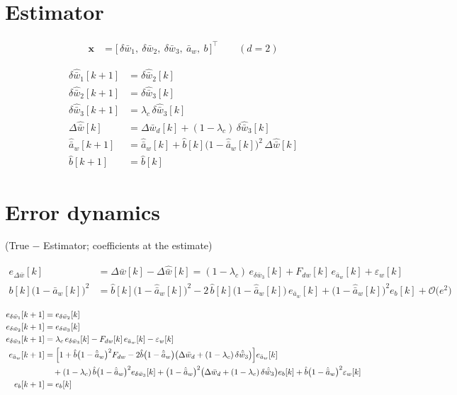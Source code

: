 \documentclass[11pt,a4paper,fontset=none]{ctexart}
\newcommand{\ba}{\bar{a}}
\newcommand{\bw}{\bar{w}}
\newcommand{\dW}{\Delta\bw}
\newcommand{\dWh}{\Delta\hat{\bw}}
\newcommand{\eD}{e_{\Delta\bw}}
\newcommand{\ah}{\hat{\ba}_w}
\newcommand{\bh}{\hat{b}}
\begin{document}
\section{Estimator}

\begin{align*}
\mathbf{x} &= \bigl[\,\delta\bw_1,\ \delta\bw_2,\ \delta\bw_3,\ \ba_w,\ b\,\bigr]^{\top} \qquad (d = 2)
\end{align*}

\begin{align*}
\delta\hat{\bw}_1[k+1] &= \delta\hat{\bw}_2[k] \\
\delta\hat{\bw}_2[k+1] &= \delta\hat{\bw}_3[k] \\
\delta\hat{\bw}_3[k+1] &= \lambda_c\,\delta\hat{\bw}_3[k] \\
\dWh[k]                &= \Delta\bw_d[k] + (1-\lambda_c)\,\delta\hat{\bw}_3[k] \\
\ah[k+1]               &= \ah[k] + \bh[k]\bigl(1-\ah[k]\bigr)^{2}\,\dWh[k] \\
\bh[k+1]               &= \bh[k]
\end{align*}

\section{Error dynamics}

(True $-$ Estimator; coefficients at the estimate)

\begin{align*}
\eD[k] &= \dW[k] - \dWh[k] = (1-\lambda_c)\,e_{\delta\bw_3}[k] + F_{dw}[k]\,e_{\ba_w}[k] + \varepsilon_w[k] \\
b[k]\bigl(1-\ba_w[k]\bigr)^{2} &= \bh[k]\bigl(1-\ah[k]\bigr)^{2} - 2\,\bh[k]\bigl(1-\ah[k]\bigr)\,e_{\ba_w}[k] + \bigl(1-\ah[k]\bigr)^{2}e_b[k] + \mathcal{O}\bigl(e^{2}\bigr)
\end{align*}

\begin{align*}
e_{\delta\bw_1}[k+1] &= e_{\delta\bw_2}[k] \\
e_{\delta\bw_2}[k+1] &= e_{\delta\bw_3}[k] \\
e_{\delta\bw_3}[k+1] &= \lambda_c\,e_{\delta\bw_3}[k] - F_{dw}[k]\,e_{\ba_w}[k] - \varepsilon_w[k] \\
e_{\ba_w}[k+1] &= \Bigl[1 + \bh\bigl(1-\ah\bigr)^{2}F_{dw} - 2\bh\bigl(1-\ah\bigr)\bigl(\Delta\bw_d + (1-\lambda_c)\,\delta\hat{\bw}_3\bigr)\Bigr]e_{\ba_w}[k] \\
  &\quad + (1-\lambda_c)\,\bh\bigl(1-\ah\bigr)^{2}e_{\delta\bw_3}[k]
        + \bigl(1-\ah\bigr)^{2}\bigl(\Delta\bw_d + (1-\lambda_c)\,\delta\hat{\bw}_3\bigr)e_b[k]
        + \bh\bigl(1-\ah\bigr)^{2}\varepsilon_w[k] \\
e_b[k+1] &= e_b[k]
\end{align*}
\end{document}

